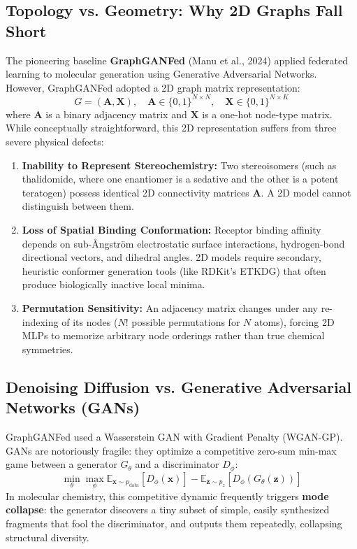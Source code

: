 \documentclass[12pt, a4paper]{article}
\begin{document}
\subsection{Topology vs. Geometry: Why 2D Graphs Fall Short}
The pioneering baseline \textbf{GraphGANFed} (Manu et al., 2024) \cite{manu2024graphganfed} applied federated learning to molecular generation using Generative Adversarial Networks. However, GraphGANFed adopted a 2D graph matrix representation:
\begin{equation}
    G = (\mathbf{A}, \mathbf{X}), \quad \mathbf{A} \in \{0, 1\}^{N \times N}, \quad \mathbf{X} \in \{0, 1\}^{N \times K}
\end{equation}
where $\mathbf{A}$ is a binary adjacency matrix and $\mathbf{X}$ is a one-hot node-type matrix. While conceptually straightforward, this 2D representation suffers from three severe physical defects:
\begin{enumerate}[leftmargin=*]
    \item \textbf{Inability to Represent Stereochemistry:} Two stereoisomers (such as thalidomide, where one enantiomer is a sedative and the other is a potent teratogen) possess identical 2D connectivity matrices $\mathbf{A}$. A 2D model cannot distinguish between them.
    \item \textbf{Loss of Spatial Binding Conformation:} Receptor binding affinity depends on sub-Ångström electrostatic surface interactions, hydrogen-bond directional vectors, and dihedral angles. 2D models require secondary, heuristic conformer generation tools (like RDKit's ETKDG) that often produce biologically inactive local minima.
    \item \textbf{Permutation Sensitivity:} An adjacency matrix changes under any re-indexing of its nodes ($N!$ possible permutations for $N$ atoms), forcing 2D MLPs to memorize arbitrary node orderings rather than true chemical symmetries.
\end{enumerate}

\subsection{Denoising Diffusion vs. Generative Adversarial Networks (GANs)}
GraphGANFed used a Wasserstein GAN with Gradient Penalty (WGAN-GP). GANs are notoriously fragile: they optimize a competitive zero-sum min-max game between a generator $G_\theta$ and a discriminator $D_\phi$:
\begin{equation}
    \min_\theta \max_\phi \mathbb{E}_{\mathbf{x} \sim p_\text{data}} [D_\phi(\mathbf{x})] - \mathbb{E}_{\mathbf{z} \sim p_z} [D_\phi(G_\theta(\mathbf{z}))]
\end{equation}
In molecular chemistry, this competitive dynamic frequently triggers \textbf{mode collapse}: the generator discovers a tiny subset of simple, easily synthesized fragments that fool the discriminator, and outputs them repeatedly, collapsing structural diversity.
\end{document}
